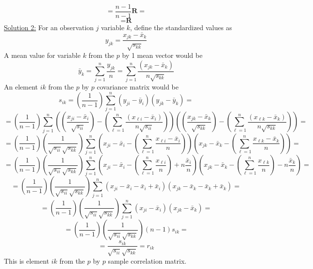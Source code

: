 \[
    =
    \frac{n-1}{n-1}
    \textbf{R}
    =
\]
\[
    =
    \textbf{R}
\]
\underline{Solution 2:}
\newline
For an observation $j$ variable $k$, define the standardized values as
\[
    y_{jk} = \frac{x_{jk} - \bar{x}_{k}}{\sqrt{s_{kk}}}
\]
A mean value for variable $k$ from the $p$ by 1 mean vector would be
\[
    \bar{y}_{k}
    =
    \sum_{j=1}^{n}{\frac{y_{jk}}{n}}
    =
    \sum_{j=1}^{n}{\frac{(x_{jk} - \bar{x}_{k})}{n\sqrt{s_{kk}}}}
\]
An element $ik$ from the $p$ by $p$ covariance matrix would be
\[
    s_{ik}
    =
    \left(\frac{1}{n-1}\right)
    \sum_{j=1}^{n}\left(y_{ji} - \bar{y}_{i} \right)\left(y_{jk} - \bar{y}_{k} \right)
    =
\]
\[
    =
    \left(\frac{1}{n-1}\right)
    \sum_{j=1}^{n}\left(\left(\frac{x_{ji} - \bar{x}_{i}}{\sqrt{s_{ii}}}\right) - \left(\sum_{\ell=1}^{n}{\frac{(x_{\ell i} - \bar{x}_{i})}{n\sqrt{s_{ii}}}}\right) \right)\left(\left(\frac{x_{jk} - \bar{x}_{k}}{\sqrt{s_{kk}}}\right) - \left(\sum_{\ell=1}^{n}{\frac{(x_{\ell k} - \bar{x}_{k})}{n\sqrt{s_{kk}}}}\right) \right)
    =
\]
\[
    =
    \left(\frac{1}{n-1}\right)
    \left(\frac{1}{\sqrt{s_{ii}}\sqrt{s_{kk}}}\right)
    \sum_{j=1}^{n}
    \left(x_{ji} - \bar{x}_{i} - \left(\sum_{\ell=1}^{n}{\frac{x_{\ell i} - \bar{x}_{i}}{n}}\right) \right)
    \left(x_{jk} - \bar{x}_{k} - \left(\sum_{\ell=1}^{n}{\frac{x_{\ell k} - \bar{x}_{k}}{n}}\right) \right)
    =
\]
\[
    =
    \left(\frac{1}{n-1}\right)
    \left(\frac{1}{\sqrt{s_{ii}}\sqrt{s_{kk}}}\right)
    \sum_{j=1}^{n}
    \left(x_{ji} - \bar{x}_{i} - \left(\sum_{\ell=1}^{n}{\frac{x_{\ell i}}{n}}\right) + n\frac{\bar{x}_{i}}{n} \right)
    \left(x_{jk} - \bar{x}_{k} - \left(\sum_{\ell=1}^{n}{\frac{x_{\ell k}}{n}}\right) - n\frac{\bar{x}_{k}}{n} \right)
    =
\]
\[
    =
    \left(\frac{1}{n-1}\right)
    \left(\frac{1}{\sqrt{s_{ii}}\sqrt{s_{kk}}}\right)
    \sum_{j=1}^{n}
    \left(x_{ji} - \bar{x}_{i} - \bar{x}_{i} + \bar{x}_{i} \right)
    \left(x_{jk} - \bar{x}_{k} - \bar{x}_{k} + \bar{x}_{k} \right)
    =
\]
\[
    =
    \left(\frac{1}{n-1}\right)
    \left(\frac{1}{\sqrt{s_{ii}}\sqrt{s_{kk}}}\right)
    \sum_{j=1}^{n}
    \left(x_{ji} - \bar{x}_{i} \right)
    \left(x_{jk} - \bar{x}_{k} \right)
    =
\]
\[
    =
    \left(\frac{1}{n-1}\right)
    \left(\frac{1}{\sqrt{s_{ii}}\sqrt{s_{kk}}}\right)
    (n-1)s_{ik}
    =
\]
\[
    =
    \frac{s_{ik}}{\sqrt{s_{ii}}\sqrt{s_{kk}}}
    =
    r_{ik}
\]
This is element $ik$ from the $p$ by $p$ sample correlation matrix.
